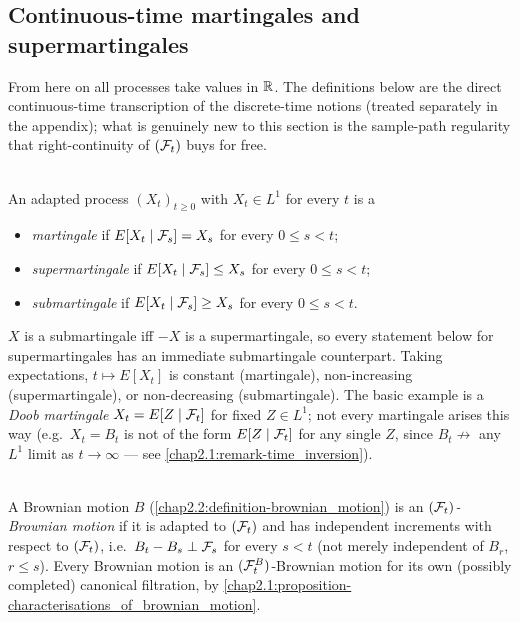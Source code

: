 \subsection{Continuous-time martingales and supermartingales}
From here on all processes take values in $\mathbb{R}$. The definitions below are the direct continuous-time transcription of the discrete-time notions (treated separately in the appendix); what is genuinely new to this section is the sample-path regularity that right-continuity of $(\mathcal{F}_t)$ buys for free.

\begin{definition} \label{chap3.3:definition-sub_super_martingale}  \\
An adapted process $(X_t)_{t\ge0}$ with $X_t\in L^1$ for every $t$ is a
\begin{itemize}
    \item \textit{martingale} if $E[X_t\mid\mathcal{F}_s]=X_s$ for every $0\le s<t$;
    \item \textit{supermartingale} if $E[X_t\mid\mathcal{F}_s]\le X_s$ for every $0\le s<t$;
    \item \textit{submartingale} if $E[X_t\mid\mathcal{F}_s]\ge X_s$ for every $0\le s<t$.
\end{itemize}
$X$ is a submartingale iff $-X$ is a supermartingale, so every statement below for supermartingales has an immediate submartingale counterpart. Taking expectations, $t\mapsto E[X_t]$ is constant (martingale), non-increasing (supermartingale), or non-decreasing (submartingale). The basic example is a \textit{Doob martingale} $X_t=E[Z\mid\mathcal{F}_t]$ for fixed $Z\in L^1$; not every martingale arises this way (e.g.\ $X_t=B_t$ is not of the form $E[Z\mid\mathcal{F}_t]$ for any single $Z$, since $B_t\not\to$ any $L^1$ limit as $t\to\infty$ --- see \cref{chap2.1:remark-time_inversion}).
\end{definition}

\begin{definition} \label{chap3.3:definition-ft_brownian_motion}  \\
A Brownian motion $B$ (\cref{chap2.2:definition-brownian_motion}) is an \textit{$(\mathcal{F}_t)$-Brownian motion} if it is adapted to $(\mathcal{F}_t)$ and has independent increments with respect to $(\mathcal{F}_t)$, i.e.\ $B_t-B_s\perp\mathcal{F}_s$ for every $s<t$ (not merely independent of $B_r$, $r\le s$). Every Brownian motion is an $(\mathcal{F}_t^B)$-Brownian motion for its own (possibly completed) canonical filtration, by \cref{chap2.1:proposition-characterisations_of_brownian_motion}.
\end{definition}

